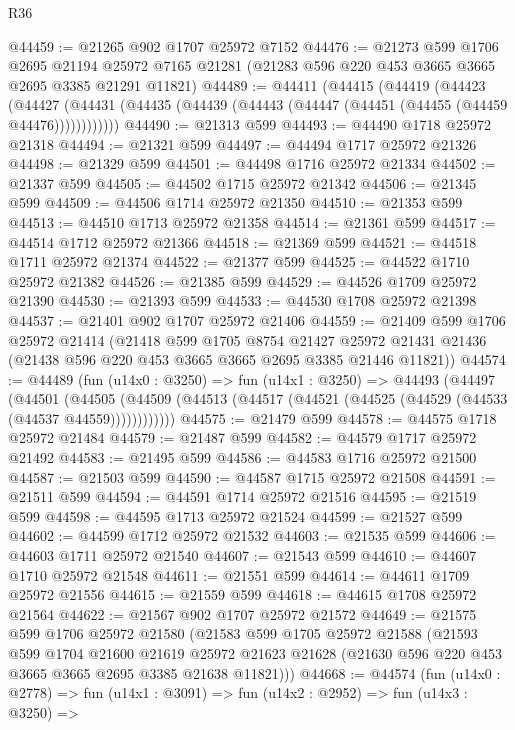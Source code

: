 \begin{lexlean}{R36}
\begin{coremodule}
@44459 := @21265 @902 @1707 @25972 @7152
@44476 := @21273
    @599
    @1706
    @2695
    @21194
    @25972
    @7165
    @21281
    (@21283 @596 @220 @453 @3665 @3665 @2695 @3385 @21291 @11821)
@44489 := @44411
    (@44415
      (@44419
        (@44423
          (@44427 (@44431 (@44435 (@44439 (@44443 (@44447 (@44451 (@44455 (@44459 @44476))))))))))))
@44490 := @21313 @599
@44493 := @44490 @1718 @25972 @21318
@44494 := @21321 @599
@44497 := @44494 @1717 @25972 @21326
@44498 := @21329 @599
@44501 := @44498 @1716 @25972 @21334
@44502 := @21337 @599
@44505 := @44502 @1715 @25972 @21342
@44506 := @21345 @599
@44509 := @44506 @1714 @25972 @21350
@44510 := @21353 @599
@44513 := @44510 @1713 @25972 @21358
@44514 := @21361 @599
@44517 := @44514 @1712 @25972 @21366
@44518 := @21369 @599
@44521 := @44518 @1711 @25972 @21374
@44522 := @21377 @599
@44525 := @44522 @1710 @25972 @21382
@44526 := @21385 @599
@44529 := @44526 @1709 @25972 @21390
@44530 := @21393 @599
@44533 := @44530 @1708 @25972 @21398
@44537 := @21401 @902 @1707 @25972 @21406
@44559 := @21409
    @599
    @1706
    @25972
    @21414
    (@21418
      @599
      @1705
      @8754
      @21427
      @25972
      @21431
      @21436
      (@21438 @596 @220 @453 @3665 @3665 @2695 @3385 @21446 @11821))
@44574 := @44489
    (fun (u14x0 : @3250) =>
    fun (u14x1 : @3250) =>
    @44493
      (@44497
        (@44501
          (@44505 (@44509 (@44513 (@44517 (@44521 (@44525 (@44529 (@44533 (@44537 @44559))))))))))))
@44575 := @21479 @599
@44578 := @44575 @1718 @25972 @21484
@44579 := @21487 @599
@44582 := @44579 @1717 @25972 @21492
@44583 := @21495 @599
@44586 := @44583 @1716 @25972 @21500
@44587 := @21503 @599
@44590 := @44587 @1715 @25972 @21508
@44591 := @21511 @599
@44594 := @44591 @1714 @25972 @21516
@44595 := @21519 @599
@44598 := @44595 @1713 @25972 @21524
@44599 := @21527 @599
@44602 := @44599 @1712 @25972 @21532
@44603 := @21535 @599
@44606 := @44603 @1711 @25972 @21540
@44607 := @21543 @599
@44610 := @44607 @1710 @25972 @21548
@44611 := @21551 @599
@44614 := @44611 @1709 @25972 @21556
@44615 := @21559 @599
@44618 := @44615 @1708 @25972 @21564
@44622 := @21567 @902 @1707 @25972 @21572
@44649 := @21575
    @599
    @1706
    @25972
    @21580
    (@21583
      @599
      @1705
      @25972
      @21588
      (@21593
        @599
        @1704
        @21600
        @21619
        @25972
        @21623
        @21628
        (@21630 @596 @220 @453 @3665 @3665 @2695 @3385 @21638 @11821)))
@44668 := @44574
    (fun (u14x0 : @2778) =>
    fun (u14x1 : @3091) =>
    fun (u14x2 : @2952) =>
    fun (u14x3 : @3250) =>

\end{coremodule}
\end{lexlean}
